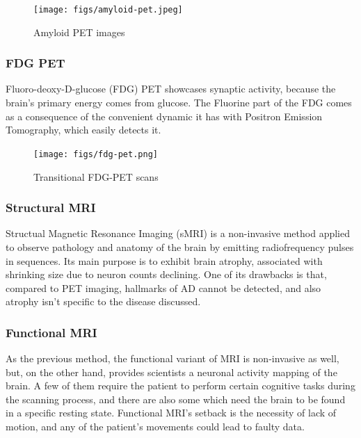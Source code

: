 \documentclass[a4paper, 12pt]{article}
\begin{document}
\begin{figure}[htbp]
    \centering
    \texttt{[image: figs/amyloid-pet.jpeg]}
    \caption{Amyloid PET images}
    \label{fig:amyloid-pet}
\end{figure}

\subsubsection*{FDG PET} %
Fluoro-deoxy-D-glucose (FDG) PET showcases synaptic activity, because the brain's primary energy comes from glucose.
The Fluorine part of the FDG comes as a consequence of the convenient dynamic it has with Positron Emission Tomography,
which easily detects it.

\begin{figure}[htbp]
    \centering
    \texttt{[image: figs/fdg-pet.png]}
    \caption{Transitional FDG-PET scans}
    \label{fig:fdg-pet}
\end{figure}

\subsubsection*{Structural MRI} %
Structual Magnetic Resonance Imaging (sMRI) is a non-invasive method applied to observe pathology and anatomy of the brain
by emitting radiofrequency pulses in sequences. Its main purpose is to exhibit brain atrophy, associated with shrinking size
due to neuron counts declining. One of its drawbacks is that, compared to PET imaging, hallmarks of AD cannot be detected,
and also atrophy isn't specific to the disease discussed.

\subsubsection*{Functional MRI} %
As the previous method, the functional variant of MRI is non-invasive as well, but, on the other hand, provides
scientists a neuronal activity mapping of the brain. A few of them require the patient to perform certain cognitive tasks
during the scanning process, and there are also some which need the brain to be found in a specific resting state.
Functional MRI's setback is the necessity of lack of motion, and any of the patient's movements could lead to faulty
data.

\end{document}
